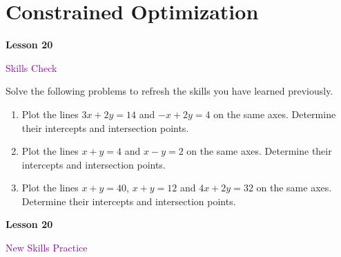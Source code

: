 \documentclass[10pt]{book}
\theoremstyle{definition}
\theoremstyle{remark}
\begin{document}
\section{Constrained Optimization}
\begin{tcolorbox}[
  width=\textwidth,
  colback=gray!10, %
  colframe=white, %
  boxrule=0pt,    %
  left=1cm,       %
  right=1cm,      %
  sharp corners  %
]

\begin{minipage}[t]{0.5\textwidth}
  \Huge \textbf{Lesson 20}
\end{minipage}%
\hfill
\begin{minipage}[t]{0.5\textwidth}
  \Huge \textcolor{purple}{Skills Check}
\end{minipage}
\end{tcolorbox}

\begin{large}
\noindent
Solve the following problems to refresh the skills you have learned previously.
\begin{enumerate}
\item Plot the lines $3x+2y=14$ and $-x+2y=4$ on the same axes. Determine their intercepts and intersection points. \vfil \vfil \vfil
\item Plot the lines $x+y=4$ and $x-y=2$ on the same axes. Determine their intercepts and intersection points.\vfil \vfil\vfil
\item Plot the lines $x+y=40$, $x+y=12$ and $4x+2y=32$ on the same axes. Determine their intercepts and intersection points.\vfil \vfil \vfil
\end{enumerate}
\end{large}
\newpage


\begin{tcolorbox}[
  width=\textwidth,
  colback=gray!10, %
  colframe=white, %
  boxrule=0pt,    %
  left=1cm,       %
  right=1cm,      %
  sharp corners  %
]

\begin{minipage}[t]{0.5\textwidth}
  \Huge \textbf{Lesson 20}
\end{minipage}%
\hfill
\begin{minipage}[t]{0.5\textwidth}
  \Huge\textcolor{purple}{New Skills Practice}
\end{minipage}
\end{tcolorbox}
\end{document}
